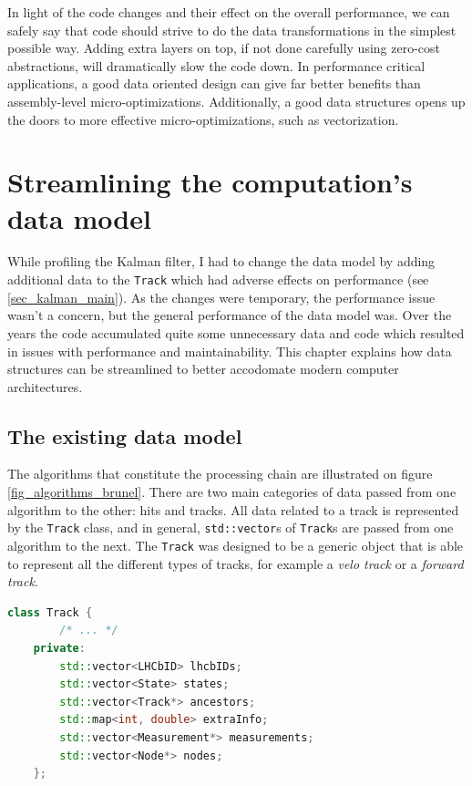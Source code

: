 \documentclass[12pt]{article}
\newcommand{\code}[1]{\texttt{#1}}
\begin{document}
In light of the code changes and their effect on the overall performance, we can safely say that code should strive to do the data transformations in the simplest possible way. Adding extra layers on top, if not done carefully using zero-cost abstractions, will dramatically slow the code down. In performance critical applications, a good data oriented design can give far better benefits than assembly-level micro-optimizations. Additionally, a good data structures opens up the doors to more effective micro-optimizations, such as vectorization.


\newpage
\section{Streamlining the computation's data model}\label{sec_datamodel_main}

While profiling the Kalman filter, I had to change the data model by adding additional data to the \code{Track} which had adverse effects on performance (see \ref{sec_kalman_main}). As the changes were temporary, the performance issue wasn't a concern, but the general performance of the data model was. Over the years the code accumulated quite some unnecessary data and code which resulted in issues with performance and maintainability. This chapter explains how data structures can be streamlined to better accodomate modern computer architectures.

\subsection{The existing data model}

The algorithms that constitute the processing chain are illustrated on figure \ref{fig_algorithms_brunel}. There are two main categories of data passed from one algorithm to the other: hits and tracks. All data related to a track is represented by the \code{Track} class, and in general, \code{std::vector}s of \code{Track}s are passed from one algorithm to the next. The \code{Track} was designed to be a generic object that is able to represent all the different types of tracks, for example a \textit{velo track} or a \textit{forward track}.

\begin{lstlisting}[language=C++,caption=Simplified code of the \code{Track} class.,label=lst_datamodel_trackv2_simple
]
	class Track {
		/* ... */
	private:
		std::vector<LHCbID> lhcbIDs;
		std::vector<State> states;
		std::vector<Track*> ancestors;
		std::map<int, double> extraInfo;
		std::vector<Measurement*> measurements;
		std::vector<Node*> nodes;
	};	
\end{lstlisting}
\end{document}
